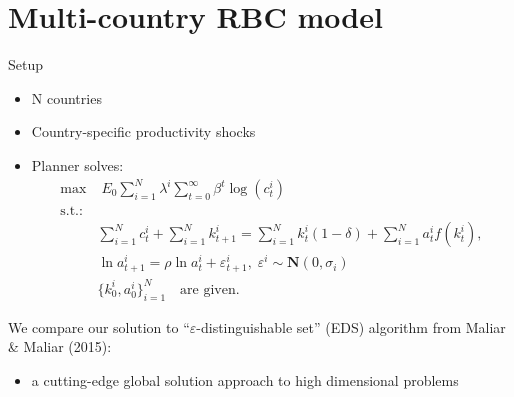 \documentclass{beamer}
\begin{document}
\section{Multi-country RBC model}
\begin{frame}{Setup}
    \begin{itemize}
        \item N countries 
        \item Country-specific productivity shocks
        \item Planner solves:
            \small
            \begin{align*}
                \max & \; E_0 \sum_{i=1}^N \lambda^i \sum_{t=0}^{\infty} \beta^t \log(c^i_{t}) \\
                \text{s.t.:} & \\
                             & \sum_{i=1}^N c^i_{t} + \sum_{i=1}^N k^i_{t+1} = \sum_{i=1}^N k^i_{t}(1-\delta) + \sum_{i=1}^N a^i_{t} f(k^i_{t}), \\
                             & \ln a^i_{t+1} = \rho \ln a^i_t + \varepsilon^i_{t+1}, \; \varepsilon^i \sim \mathbf{N}(0,\sigma_i) \\
                             & \{k^i_0,a^i_0\}_{i=1}^N \quad \text{are given}.
            \end{align*}
            \normalsize
    \end{itemize}
    We compare our solution to ``$\varepsilon$-distinguishable set'' (EDS) algorithm 
    from Maliar \& Maliar (2015):
    \begin{itemize}
        \item a cutting-edge global solution approach to high dimensional problems
    \end{itemize}
    
\end{frame}
\end{document}
